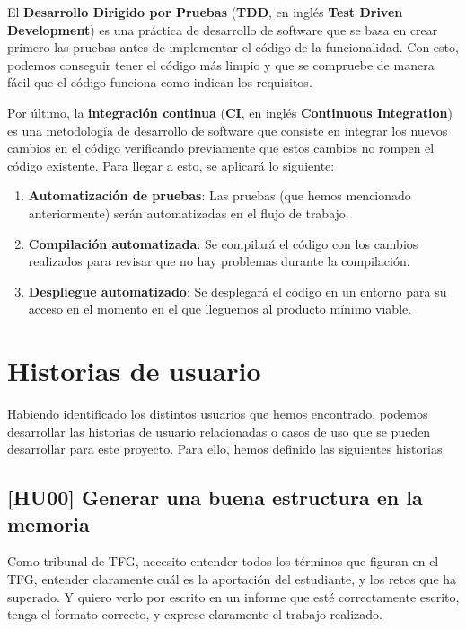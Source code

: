 El \textbf{Desarrollo Dirigido por Pruebas} (\textbf{TDD}, en inglés \textbf{Test 
Driven Development}) \cite{tdd} es una práctica de desarrollo de software que se 
basa en crear primero las pruebas antes de implementar el código de la 
funcionalidad. Con esto, podemos conseguir tener el código más limpio y que se 
compruebe de manera fácil que el código funciona como indican los requisitos.

Por último, la \textbf{integración continua} (\textbf{CI}, en inglés 
\textbf{Continuous Integration}) \cite{ci} es una metodología de desarrollo de 
software que consiste en integrar los nuevos cambios en el código verificando 
previamente que estos cambios no rompen el código existente. Para llegar a esto, se 
aplicará lo siguiente:

\begin{enumerate}
    \item \textbf{Automatización de pruebas}: Las pruebas (que hemos mencionado 
    anteriormente) serán automatizadas en el flujo de trabajo.
    \item \textbf{Compilación automatizada}: Se compilará el código con los cambios 
    realizados para revisar que no hay problemas durante la compilación.
    \item \textbf{Despliegue automatizado}: Se desplegará el código en un entorno 
    para su acceso en el momento en el que lleguemos al producto mínimo viable.
\end{enumerate}

\section{Historias de usuario}

Habiendo identificado los distintos usuarios que hemos encontrado, podemos 
desarrollar las historias de usuario relacionadas o casos de uso que se pueden 
desarrollar para este proyecto. Para ello, hemos definido las siguientes historias:

\subsection{[HU00] Generar una buena estructura en la memoria}

Como tribunal de TFG, necesito entender todos los términos que figuran en el TFG, 
entender claramente cuál es la aportación del estudiante, y los retos que ha 
superado. Y quiero verlo por escrito en un informe que esté correctamente escrito, 
tenga el formato correcto, y exprese claramente el trabajo realizado.

